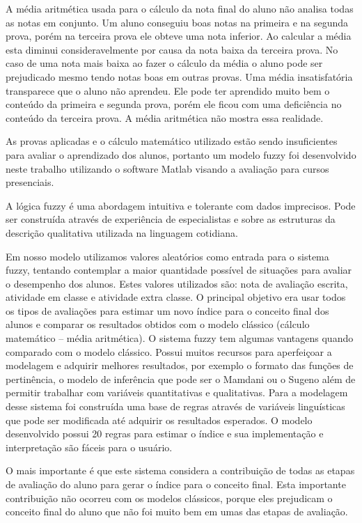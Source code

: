 \documentclass{article}
\begin{document}
A média aritmética usada para o cálculo da nota final
do aluno não analisa todas as notas em conjunto. Um aluno
conseguiu boas notas na primeira e na segunda prova, porém
na terceira prova ele obteve uma nota inferior. Ao calcular
a média esta diminui consideravelmente por causa da nota
baixa da terceira prova. No caso de uma nota mais baixa ao
fazer o cálculo da média o aluno pode ser prejudicado mesmo
tendo notas boas em outras provas. Uma média insatisfatória
transparece que o aluno não aprendeu. Ele pode ter aprendido
muito bem o conteúdo da primeira e segunda prova, porém ele
ficou com uma deficiência no conteúdo da terceira prova. A
média aritmética não mostra essa realidade.


As provas aplicadas e o cálculo matemático utilizado estão
sendo insuficientes para avaliar o aprendizado dos alunos,
portanto um modelo fuzzy foi desenvolvido neste trabalho
utilizando o software Matlab visando a avaliação para cursos
presenciais.


A lógica fuzzy é uma abordagem intuitiva e tolerante com dados
imprecisos. Pode ser construída através de experiência de
especialistas e sobre as estruturas da descrição qualitativa
utilizada na linguagem cotidiana.

Em nosso modelo utilizamos valores aleatórios como entrada
para o sistema fuzzy, tentando contemplar a maior quantidade
possível de situações para avaliar o desempenho dos alunos.
Estes valores utilizados são: nota de avaliação escrita,
atividade em classe e atividade extra classe. O principal
objetivo era usar todos os tipos de avaliações para estimar
um novo índice para o conceito final dos alunos e comparar os
resultados obtidos com o modelo clássico (cálculo matemático
– média aritmética). O sistema fuzzy tem algumas vantagens
quando comparado com o modelo clássico. Possui muitos recursos
para aperfeiçoar a modelagem e adquirir melhores resultados,
por exemplo o formato das funções de pertinência, o modelo de
inferência que pode ser o Mamdani ou o Sugeno além de permitir
trabalhar com variáveis quantitativas e qualitativas. Para
a modelagem desse sistema foi construída uma base de regras
através de variáveis linguísticas que pode ser modificada
até adquirir os resultados esperados. O modelo desenvolvido
possui 20 regras para estimar o índice e sua implementação e
interpretação são fáceis para o usuário.


O mais importante é que este sistema considera a contribuição
de todas as etapas de avaliação do aluno para gerar o índice
para o conceito final. Esta importante contribuição não
ocorreu com os modelos clássicos, porque eles prejudicam o
conceito final do aluno que não foi muito bem em umas das
etapas de avaliação.
\end{document}
